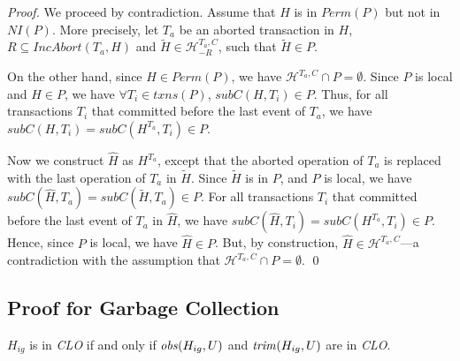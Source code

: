 \documentclass{llncs}
\def\H{\ensuremath{\mathcal{H}}}
\newcommand{\id}[1]{\mbox{\textit{#1}}}\newcommand{\res}[1]{\mbox{\textbf{#1}}}
\newcommand{\clo} {\textit{CLO}}
\newcommand{\txns}{\textit{txns}}
\newcommand{\permfn}[1] {\textit{Perm}(#1)}
\newcommand{\nifn}[1] {\textit{NI}(#1)}
\newcommand{\prevA}[2] {\textit{IncAbort}(#1, #2)}
\newcommand{\subs}[2]  {\textit{subC}(#2,#1)}
\begin{document}
\begin{proof}
We proceed by contradiction. Assume that $H$ is in
$\permfn{P}$ but not in $\nifn{P}$. 
More precisely, let $T_a$ be an aborted transaction in $H$, 
$R \subseteq \prevA{T_a}{H}$ and  
$\widetilde H \in \H^{T_a,C}_{-R}$, such that  $\widetilde H \in P$.

On the other hand, since $H\in \permfn{P}$, we have  
$\H^{T_a,C} \cap P = \emptyset$.
Since $P$ is local and $H\in P$, we have $\forall T_i\in\txns(P)$, 
 $\subs{T_i}{H}\in P$. 
Thus, for all transactions $T_i$ that
 committed before the last event of $T_a$, we have  
$\subs{T_i}{H}=\subs{T_i}{H^{T_a}}\in P$.    

Now we construct $\widehat H$ as $H^{T_a}$, except that the aborted
operation of $T_a$ is replaced with the last operation of $T_a$ in
$\widetilde H$.  Since $\widetilde H$ is in $P$, and $P$ is local, 
we have $\subs{T_a}{\widehat H} =
\subs{T_a}{\widetilde H}\in P$. 
For all transactions $T_i$ that committed before the last event of $T_a$ in
$\widehat H$, we have  $\subs{T_i}{\widehat H}=\subs{T_i}{H^{T_a}}\in P$.
Hence, since $P$ is local, we have $\widehat H\in P$.
But, by construction, $\widehat H\in\H^{T_a,C}$---a contradiction with
the assumption that $\H^{T_a,C} \cap P = \emptyset$.
\qed
\end{proof}



\subsection{Proof for Garbage Collection}
\label{subsec:ap-garbage}

\begin{lemma}
\label{lem:ap-trimmed}   
$H_{ig}$ is in {\clo} if and only if $\id{obs}(H_{ig},U)$ and $\id{trim}(H_{ig},U)$ are in {\clo}. 
\end{lemma}
\end{document}
